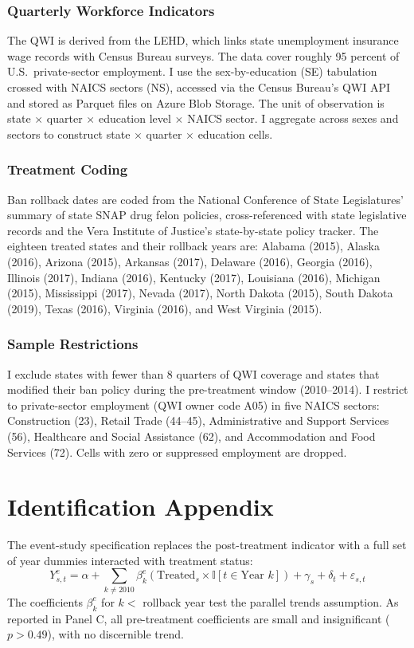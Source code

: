 \documentclass[12pt]{article}
\newcommand{\ind}{\mathbb{I}}
\begin{document}
\subsubsection*{Quarterly Workforce Indicators} The QWI is derived from the LEHD, which links state unemployment insurance wage records with Census Bureau surveys. The data cover roughly 95 percent of U.S.\ private-sector employment. I use the sex-by-education (SE) tabulation crossed with NAICS sectors (NS), accessed via the Census Bureau's QWI API and stored as Parquet files on Azure Blob Storage. The unit of observation is state $\times$ quarter $\times$ education level $\times$ NAICS sector. I aggregate across sexes and sectors to construct state $\times$ quarter $\times$ education cells.

\subsubsection*{Treatment Coding} Ban rollback dates are coded from the National Conference of State Legislatures' summary of state SNAP drug felon policies, cross-referenced with state legislative records and the Vera Institute of Justice's state-by-state policy tracker. The eighteen treated states and their rollback years are: Alabama (2015), Alaska (2016), Arizona (2015), Arkansas (2017), Delaware (2016), Georgia (2016), Illinois (2017), Indiana (2016), Kentucky (2017), Louisiana (2016), Michigan (2015), Mississippi (2017), Nevada (2017), North Dakota (2015), South Dakota (2019), Texas (2016), Virginia (2016), and West Virginia (2015).

\subsubsection*{Sample Restrictions} I exclude states with fewer than 8 quarters of QWI coverage and states that modified their ban policy during the pre-treatment window (2010--2014). I restrict to private-sector employment (QWI owner code A05) in five NAICS sectors: Construction (23), Retail Trade (44--45), Administrative and Support Services (56), Healthcare and Social Assistance (62), and Accommodation and Food Services (72). Cells with zero or suppressed employment are dropped.

\section{Identification Appendix}
\label{sec:id_appendix}

The event-study specification replaces the post-treatment indicator with a full set of year dummies interacted with treatment status:
\begin{equation}
Y_{s,t}^{e} = \alpha + \sum_{k \neq 2010} \beta_{k}^{e} \left(\text{Treated}_{s} \times \ind[t \in \text{Year } k]\right) + \gamma_{s} + \delta_{t} + \varepsilon_{s,t}
\end{equation}
The coefficients $\beta_{k}^{e}$ for $k < $ rollback year test the parallel trends assumption. As reported in  Panel C, all pre-treatment coefficients are small and insignificant ($p > 0.49$), with no discernible trend.
\end{document}

